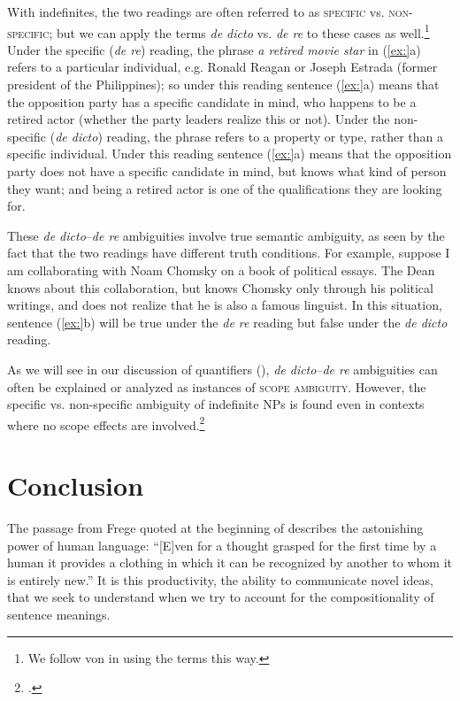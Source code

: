 With indefinites, the two readings are often referred to as \textsc{specific} vs. \textsc{non-specific}; but we can apply the terms \textit{de dicto} vs. \textit{de re} to these cases as well.\footnote{We follow von \citet{Heusinger2011} in using the terms this way.} Under the specific (\textit{de re}) reading, the phrase \textit{a retired movie star} in (\ref{ex:}a) refers to a particular individual, e.g. Ronald Reagan or Joseph Estrada (former president of the Philippines); so under this reading sentence (\ref{ex:}a) means that the opposition party has a specific candidate in mind, who happens to be a retired actor (whether the party leaders realize this or not). Under the non-specific (\textit{de dicto}) reading, the phrase refers to a property or type, rather than a specific individual. Under this reading sentence (\ref{ex:}a) means that the opposition party does not have a specific candidate in mind, but knows what kind of person they want; and being a retired actor is one of the qualifications they are looking for.



These \textit{de dicto}–\textit{de re} ambiguities involve true semantic ambiguity, as seen by the fact that the two readings have different truth conditions. For example, suppose I am collaborating with Noam Chomsky on a book of political essays. The Dean knows about this collaboration, but knows Chomsky only through his political writings, and does not realize that he is also a famous linguist. In this situation, sentence (\ref{ex:}b) will be true under the \textit{de re} reading but false under the \textit{de dicto} reading.



As we will see in our discussion of quantifiers (), \textit{de dicto}–\textit{de re} ambiguities can often be explained or analyzed as instances of \textsc{scope ambiguity}. However, the specific vs. non-specific ambiguity of indefinite NPs is found even in contexts where no scope effects are involved.\footnote{\citet{FodorSag1982}.}


\section{Conclusion}\label{sec:12.6}

The passage from Frege quoted at the beginning of  describes the astonishing power of human language: “[E]ven for a thought grasped for the first time by a human it provides a clothing in which it can be recognized by another to whom it is entirely new.” It is this productivity, the ability to communicate novel ideas, that we seek to understand when we try to account for the compositionality of sentence meanings.



